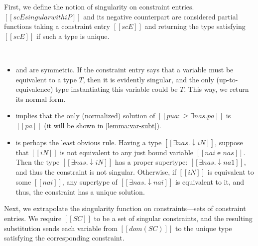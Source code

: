 First, we define the notion of singularity on constraint entries. 
$[[scE singular with iP]]$ and its negative counterpart 
are considered partial functions taking a constraint entry $[[scE]]$
and returning the type satisfying $[[scE]]$ if such a type is unique. 

\begin{algorithm}
  \hfill\\
  \ottdefnSINGscEPLabeled[\apppref]{}
  \ottdefnSINGscENLabeled[\apppref]{}
\end{algorithm}

\begin{itemize}
  \item {} and  
    are symmetric. If the constraint entry says that a variable must be equivalent to 
    a type $T$, then it is evidently singular, and the only (up-to-equivalence) type
    instantiating this variable could be $T$. This way, we return its normal form. 
  \item {}
    implies that the only (normalized) solution of $[[pua :≥ ∃nas.pa]]$ is 
    $[[pa]]$ (it will be shown in \cref{lemma:var-subt}).
  \item {}
    is perhaps the least obvious rule.
    Having a type $[[∃nas.↓iN]]$, suppose that $[[iN]]$ is
    not equivalent to any just bound variable $[[nai ∊ {nas}]]$.
    Then the type $[[∃nas.↓iN]]$ has a proper supertype: $[[∃nas.↓na1]]$,
    and thus the constraint is not singular.
    Otherwise, if $[[iN]]$ is equivalent to some $[[nai]]$,
    any supertype of $[[∃nas.↓nai]]$ is equivalent to it, and thus, 
    the constraint has a unique solution.
\end{itemize}

Next, we extrapolate the singularity function on constraints---sets of constraint entries. 
We require $[[SC]]$ to be a set of singular constraints, and the resulting substitution
sends each variable from $[[dom(SC)]]$ to the unique type satisfying the corresponding constraint.

